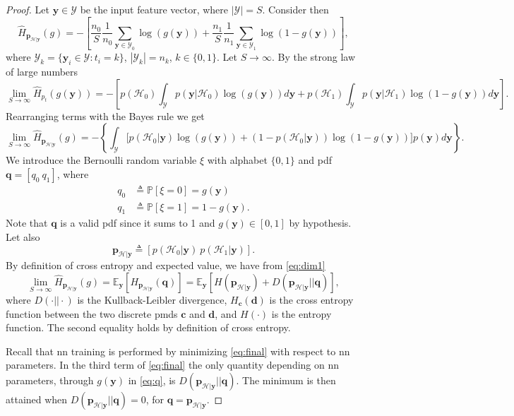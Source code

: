 \documentclass[conference,draftcls,onecolumn]{IEEEtran}
\newcommand{\cross}[2]{H_{#1}(#2)}
\newcommand{\hatcross}[2]{\hat{H}_{#1}(#2)}
\newcommand{\gy}{g(\bm y)}
\newcommand{\E}[2]{\mathbb{E}_{#1}\left[#2\right]}
\newcommand{\pr}[1]{\mathbb{P} \left[ #1 \right]}
\begin{document}
\begin{proof}
Let $\bm y \in \mathcal{Y}$ be the input feature vector, where $|\mathcal{Y}|=S$. Consider then 
\begin{equation}
	\hatcross{\bm p_{\mathcal{H}|\bm y}}{g} = - \left[ \frac{n_0}{S} \frac{1}{n_0} \sum_{\bm y \in \mathcal{Y}_0} \log(\gy) 
		+ \frac{n_1}{S} \frac{1}{n_1} \sum_{\bm y \in \mathcal{Y}_1} \log(1-\gy) \right],	
\end{equation}
where $\mathcal{Y}_k = \{\bm y_i \in \mathcal{Y} : t_i = k\}$, $|\mathcal{Y}_k|=n_k$, $k \in \{0,1\}$.
Let $S \to \infty$. By the strong law of large numbers \cite{etemadi1981elementary}
\begin{equation}
	\lim_{S \to \infty}	\hatcross{p_t}{\gy} = - \left[ p(\mathcal{H}_0) \int_{\mathcal{Y}} p(\bm y|\mathcal{H}_0) \log (\gy) d\bm y + 
		 p(\mathcal{H}_1) \int_{\mathcal{Y}} p(\bm y|\mathcal{H}_1) \log (1-\gy) d\bm y \right]. 
\end{equation}
Rearranging terms with the Bayes rule we get
\begin{equation}
\label{eq:dim1}
\lim_{S \to \infty}	\hatcross{\bm p_{\mathcal{H}|\bm y}}{g} = - \left\{ \int_{\mathcal{Y}} \bigl[ p(\mathcal{H}_0|\bm y) \log(\gy) + 
	(1-p(\mathcal{H}_0|\bm y)) \log(1-\gy)\bigr] p(\bm y)   d\bm y \right\}. 		
\end{equation}
We introduce the Bernoulli random variable $\xi$ with alphabet $ \{0,1\}$ and \ac{pdf} $\bm q = [q_0 \ q_1]$, where
\begin{subequations}
\label{eq:q}
\begin{align}
	q_0 &\triangleq \pr{\xi=0}=\gy \\
	q_1 &\triangleq \pr{\xi=1}=1-\gy.
\end{align}
\end{subequations}
Note that $\bm q$ is a valid \ac{pdf} since it sums to 1 and $\gy \in [0,1]$ by hypothesis. Let also 
\begin{equation}
	\bm p_{\mathcal{H}|\bm y} \triangleq [p(\mathcal{H}_0|\bm y)\ p(\mathcal{H}_1|\bm y)].	
\end{equation}
By definition of cross entropy and expected value, we have from \eqref{eq:dim1}
\begin{equation}
\label{eq:final}
	\lim_{S \to \infty}	\hatcross{\bm p_{\mathcal{H}|\bm y}}{g} =	\E{\bm y}{ \cross{\bm p_{\mathcal{H}|\bm y}}{\bm q}} = 
		\E{\bm y}{H (\bm p_{\mathcal{H}|\bm y}) + D(\bm p_{\mathcal{H}|\bm y}||\bm q)},
\end{equation}
where $D(\cdot||\cdot)$ is the Kullback-Leibler divergence, $H_{\bm c}(\bm d)$ is the cross entropy function between the two discrete \acp{pmd} $\bm c$ and $\bm d$, and $H(\cdot)$ is the entropy function. The second equality holds by definition of cross entropy.

Recall that \ac{nn} training is performed by minimizing \eqref{eq:final} with respect to \ac{nn} parameters. In the third term of \eqref{eq:final} the only quantity depending on \ac{nn} parameters, through $\gy$ in \eqref{eq:q}, is $D(\bm p_{\mathcal{H}|\bm y}||\bm q)$. The minimum is then attained when $D(\bm p_{\mathcal{H}|\bm y}||\bm q)=0$, for $\bm q = \bm p_{\mathcal{H}|\bm y}$.
\end{proof}
\end{document}
